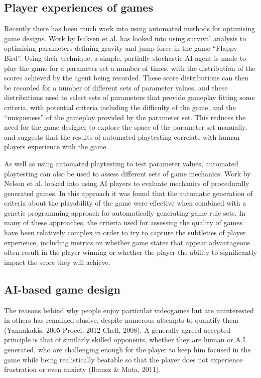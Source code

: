 \subsection{Player experiences of games}

Recently there has been much work into using automated methods for optimising game designs. Work by Isaksen et al.\cite{isaksen2015exploring}\cite{isaksendiscovering} has looked into using survival analysis to optimising parameters defining gravity and jump force in the game ``Flappy Bird''. Using their technique, a simple, partially stochastic AI agent is made to play the game for a parameter set a number of times, with the distribution of the scores achieved by the agent being recorded. These score distributions can then be recorded for a number of different sets of parameter values, and these distributions used to select sets of parameters that provide gameplay fitting some criteria, with potential criteria including the difficulty of the game, and the ``uniqueness'' of the gameplay provided by the parameter set. This reduces the need for the game designer to explore the space of the parameter set manually, and suggests that the results of automated playtesting correlate with human players experience with the game.

As well as using automated playtesting to test parameter values, automated playtesting can also be used to assess different sets of game mechanics. Work by Nelson et al. looked into using AI players to evaluate mechanics of procedurally generated games\cite{nelson2015rules}. In this approach it was found that the automatic generation of criteria about the playability of the game were effective when combined with a genetic programming approach for automatically generating game rule sets. In many of these approaches, the criteria used for assessing the quality of games have been relatively complex in order to try to capture the subtleties of player experience, including metrics on whether game states that appear advantageous often result in the player winning\cite{nelson2015rules} or whether the player the ability to significantly impact the score they will achieve\cite{cook2011multi}.

\subsection{AI-based game design}

The reasons behind why people enjoy particular videogames but are uninterested in others has remained elusive, despite numerous attempts to quantify them (Yannakakis, 2005 Procci, 2012 Chell, 2008). A generally agreed accepted principle is that of similarly skilled opponents, whether they are human or A.I. generated, who are challenging enough for the player to keep him focused in the game while being realistically beatable so that the player does not experience frustration or even anxiety (Ibanez \& Mata, 2011).

